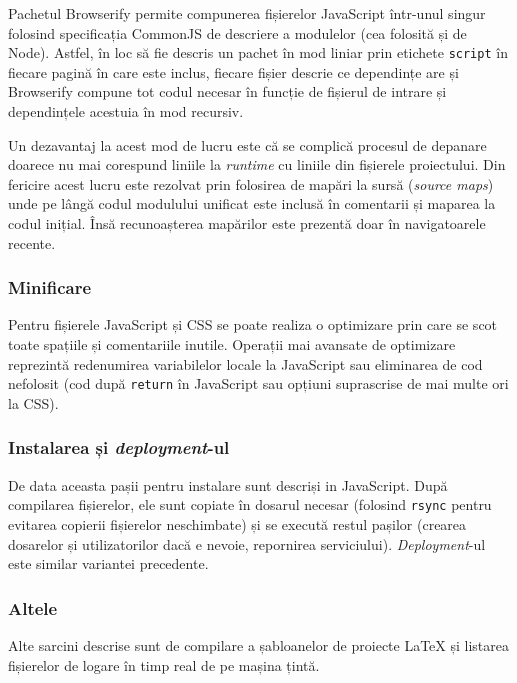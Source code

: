\documentclass[a4wide,12pt]{report}
\newcommand{\eng}[1]{\emph{#1}} %
\newcommand{\cod}[1]{\texttt{#1}}
\begin{document}
Pachetul Browserify permite compunerea fișierelor JavaScript într-unul singur
folosind specificația CommonJS de descriere a modulelor (cea folosită și de
Node). Astfel, în loc să fie descris un pachet în mod liniar prin etichete
\cod{script} în fiecare pagină în care este inclus, fiecare fișier descrie ce
dependințe are și Browserify compune tot codul necesar în funcție de fișierul de
intrare și dependințele acestuia în mod recursiv.

Un dezavantaj la acest mod de lucru este că se complică procesul de depanare
doarece nu mai corespund liniile la \eng{runtime} cu liniile din fișierele
proiectului. Din fericire acest lucru este rezolvat prin folosirea de mapări la
sursă (\eng{source maps}) unde pe lângă codul modulului unificat este inclusă în
comentarii și maparea la codul inițial. Însă recunoașterea mapărilor este
prezentă doar în navigatoarele recente.

\subsubsection{Minificare}

Pentru fișierele JavaScript și CSS se poate realiza o optimizare prin care se
scot toate spațiile și comentariile inutile. Operații mai avansate de optimizare
reprezintă redenumirea variabilelor locale la JavaScript sau eliminarea de cod
nefolosit (cod după \cod{return} în JavaScript sau opțiuni suprascrise de mai
multe ori la CSS).

\subsubsection{Instalarea și \eng{deployment}-ul}

De data aceasta pașii pentru instalare sunt descriși in JavaScript. După
compilarea fișierelor, ele sunt copiate în dosarul necesar (folosind \cod{rsync}
pentru evitarea copierii fișierelor neschimbate) și se execută restul pașilor
(crearea dosarelor și utilizatorilor dacă e nevoie, repornirea serviciului).
\eng{Deployment}-ul este similar variantei precedente.

\subsubsection{Altele}

Alte sarcini descrise sunt de compilare a șabloanelor de proiecte \LaTeX{} și
listarea fișierelor de logare în timp real de pe mașina țintă.
\end{document}
